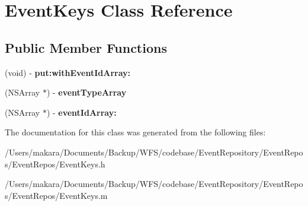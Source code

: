\hypertarget{interface_event_keys}{
\section{\-Event\-Keys \-Class \-Reference}
\label{interface_event_keys}
}
\subsection*{\-Public \-Member \-Functions}
\begin{DoxyCompactItemize}
\item 
\hypertarget{interface_event_keys_a687936cda012fa2b3d1aa33ac0d596c2}{
(void) -\/ {\bfseries put\-:with\-Event\-Id\-Array\-:}}
\label{interface_event_keys_a687936cda012fa2b3d1aa33ac0d596c2}

\item 
\hypertarget{interface_event_keys_a7d9d84c9a553466296de945365d2a468}{
(\-N\-S\-Array $\ast$) -\/ {\bfseries event\-Type\-Array}}
\label{interface_event_keys_a7d9d84c9a553466296de945365d2a468}

\item 
\hypertarget{interface_event_keys_a0447a396a3a8687e43e4f8bbbdd07ba4}{
(\-N\-S\-Array $\ast$) -\/ {\bfseries event\-Id\-Array\-:}}
\label{interface_event_keys_a0447a396a3a8687e43e4f8bbbdd07ba4}

\end{DoxyCompactItemize}


\-The documentation for this class was generated from the following files\-:\begin{DoxyCompactItemize}
\item 
/\-Users/makara/\-Documents/\-Backup/\-W\-F\-S/codebase/\-Event\-Repository/\-Event\-Repos/\-Event\-Repos/\-Event\-Keys.\-h\item 
/\-Users/makara/\-Documents/\-Backup/\-W\-F\-S/codebase/\-Event\-Repository/\-Event\-Repos/\-Event\-Repos/\-Event\-Keys.\-m\end{DoxyCompactItemize}
